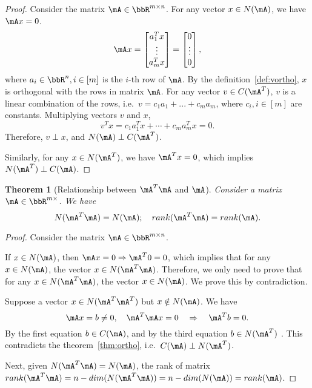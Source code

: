 \documentclass[11pt]{article}
\theoremstyle{plain}
\newtheorem{thm}{Theorem}[section]
\theoremstyle{definition}
\begin{document}
\begin{proof}
	Consider the matrix $\mA \in \bbR^{m \times n}$. For any vector $x \in N(\mA)$, we have $\mA x = 0$. 
	\begin{align}
		\mA x  = \begin{bmatrix}
			a_1^T x \\ \vdots \\ a_m^T x 
		\end{bmatrix} = \begin{bmatrix}
			0\\ \vdots \\0
		\end{bmatrix},
	\end{align}
	where $a_i \in \bbR^n, i \in [m]$ is the $i$-th  row of $\mA$. By the definition~\ref{def:vortho}, $x$ is orthogonal with the rows in matrix $\mA$. For any vector $v \in C(\mA^T)$, $v$ is a linear combination of the rows, i.e.\ $v = c_1 a_1 + ...+c_m a_m$, where $c_i, i\in [m]$ are constants. Multiplying vectors $v$ and $x$,
	\[  v^T x =  c_1 a_1^T x + \cdots + c_m a_m^T x = 0.  \]
	Therefore, $v \perp x$, and $N(\mA) \perp C(\mA^T)$.
	
	Similarly, for any $x \in N(\mA^T)$, we have $\mA^T x = 0$, which implies $N(\mA^T) \perp C(\mA)$. 
\end{proof}

\begin{thm}[Relationship between $\mA^T \mA$ and $\mA$]\label{thm:aa}
	Consider a matrix $\mA \in \bbR^{m \times}$. We have
	\begin{equation}
		N(\mA^T \mA) = N(\mA) ; \quad rank(\mA^T \mA) = rank(\mA).
	\end{equation}
\end{thm}
\begin{proof}
	Consider the matrix $\mA \in \bbR^{m \times n}$. 
	
	If $x \in N(\mA)$, then $\mA x = 0 \Rightarrow \mA^T 0 = 0$, which implies that for any $x \in N(\mA)$, the vector $x \in N(\mA^T \mA)$. Therefore, we only need to prove that for any $x \in N(\mA^T \mA)$, the vector $x \in N(\mA)$. We prove this by contradiction.
	
	Suppose a vector $x \in N(\mA^T \mA^T)$ but $x \notin N(\mA)$. We have
	\[ \mA x = b \neq 0, \quad \mA^T \mA x = 0 \quad \Rightarrow \quad \mA^T b = 0. \]
	By the first equation $b \in C(\mA)$, and by the third equation $ b \in N(\mA^T)$ . This contradicts the theorem~\ref{thm:ortho}, i.e.\ $C(\mA) \perp N(\mA^T)$. 
	
	Next, given $N(\mA^T \mA) = N(\mA)$, the rank of matrix $rank(\mA^T \mA) = n - dim(N(\mA^T \mA)) = n - dim(N(\mA)) = rank(\mA)$.
\end{proof}
\end{document}
